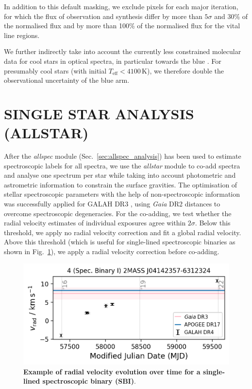 \documentclass[
  journal=pasa,
  manuscript=research-paper, %
  year=2024,
  volume=37
]{cup-journal}
\newcommand{\Gaia}{\textit{Gaia}\xspace}
\begin{document}
In addition to this default masking, we exclude pixels for each major iteration, for which the flux of observation and synthesis differ by more than $5 \sigma$ and 30\% of the normalised flux and by more than 100\% of the normalised flux for the vital line regions.

We further indirectly take into account the currently less constrained molecular data for cool stars in optical spectra, in particular towards the blue \citep[e.g.][]{Rains2021}. For presumably cool stars (with initial $T_\text{eff} < 4100\,\mathrm{K}$), we therefore double the observational uncertainty of the blue arm.

\section{SINGLE STAR ANALYSIS (ALLSTAR)}
\label{sec:allstar_analysis}

After the \textit{allspec} module (Sec.~\ref{sec:allspec_analysis}) has been used to estimate spectroscopic labels for all spectra, we use the \textit{allstar} module to co-add spectra and analyse one spectrum per star while taking into account photometric and astrometric information to constrain the surface gravities. The optimisation of stellar spectroscopic parameters with the help of non-spectroscopic information was successfully applied for GALAH DR3 \citep{Buder2021}, using \Gaia DR2 distances \citep{BailerJones2018} to overcome spectroscopic degeneracies. For the co-adding, we test whether the radial velocity estimates of individual exposures agree within $2\sigma$. Below this threshold, we apply no radial velocity correction and fit a global radial velocity. Above this threshold (which is useful for single-lined spectroscopic binaries as shown in Fig.~\ref{fig:examples_flag_sp_2}), we apply a radial velocity correction before co-adding.

\begin{figure}[ht]
 \centering
 \includegraphics[width=\textwidth]{figures/examples_flag_sp_2.png}
 \caption{\textbf{Example of radial velocity evolution over time for a single-lined spectroscopic binary (SBI)}.}
 \label{fig:examples_flag_sp_2}
\end{figure}
\end{document}
